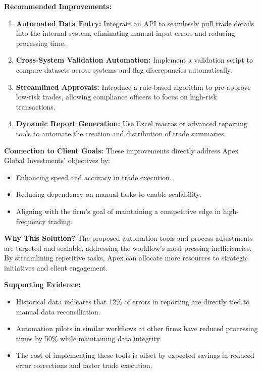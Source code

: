 \documentclass[11pt]{article}
\begin{document}
\begin{tcolorbox}[enhanced, colback=boxgray, frame hidden, arc=2mm,
    left=5mm, right=5mm, top=4mm, bottom=4mm, breakable]
\textbf{Recommended Improvements:}
\begin{enumerate}[leftmargin=1.5em, itemsep=2pt]
  \item \textbf{Automated Data Entry:} Integrate an API to seamlessly pull
  trade details into the internal system, eliminating manual input errors and
  reducing processing time.
  \item \textbf{Cross-System Validation Automation:} Implement a validation
  script to compare datasets across systems and flag discrepancies
  automatically.
  \item \textbf{Streamlined Approvals:} Introduce a rule-based algorithm to
  pre-approve low-risk trades, allowing compliance officers to focus on
  high-risk transactions.
  \item \textbf{Dynamic Report Generation:} Use Excel macros or advanced
  reporting tools to automate the creation and distribution of trade
  summaries.
\end{enumerate}
\textbf{Connection to Client Goals:} These improvements directly address Apex
Global Investments' objectives by:
\begin{itemize}[leftmargin=1.5em, itemsep=2pt]
  \item Enhancing speed and accuracy in trade execution.
  \item Reducing dependency on manual tasks to enable scalability.
  \item Aligning with the firm's goal of maintaining a competitive edge in
  high-frequency trading.
\end{itemize}

\textbf{Why This Solution?} The proposed automation tools and process
adjustments are targeted and scalable, addressing the workflow's most pressing
inefficiencies. By streamlining repetitive tasks, Apex can allocate more
resources to strategic initiatives and client engagement.\par\smallskip
\textbf{Supporting Evidence:}
\begin{itemize}[leftmargin=1.5em, itemsep=2pt]
  \item Historical data indicates that 12\% of errors in reporting are
  directly tied to manual data reconciliation.
  \item Automation pilots in similar workflows at other firms have reduced
  processing times by 50\% while maintaining data integrity.
  \item The cost of implementing these tools is offset by expected savings in
  reduced error corrections and faster trade execution.
\end{itemize}


\end{tcolorbox}
\end{document}
